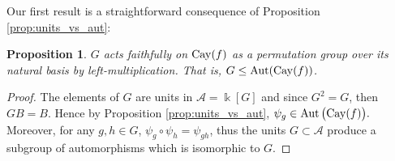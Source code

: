\documentclass[a4paper,12pt]{amsart}
\newtheorem{proposition}[theorem]{Proposition}
\theoremstyle{definition}
\theoremstyle{remark}
\newtheorem{remark}[theorem]{Remark}
\newcommand{\Aut}{\operatorname{Aut}}
\newcommand{\Cay}{{\rm Cay}}
\newcommand{\supp}{\operatorname{supp}}
\newcommand{\A}{\mathcal{A}}
\begin{document}
Our first result is a straightforward consequence of Proposition \ref{prop:units_vs_aut}:
\begin{proposition}\label{prop:faith}
	$G$ acts faithfully on $\Cay(f)$ as a permutation group over its natural basis by left-multiplication. That is, $G\leq \Aut(\Cay(f))$.
\end{proposition}
\begin{proof}
The elements of $G$ are units in $\A=\Bbbk[G]$ and since $G^2=G$, then $GB=B$. Hence by Proposition \ref{prop:units_vs_aut}, $\psi_g \in \Aut\big(\Cay(f)\big).$ Moreover, for any $g,h\in G$, $\psi_g\circ\psi_h=\psi_{gh}$, thus the units $G\subset \A$ produce  a subgroup of automorphisms which is isomorphic to $G$.
\end{proof}

	\begin{comment}
	Suppose that $\Cay(f)$ is regular but not simple.
	To prove that $\Cay(f)$ is simple, we use Corollary 4.6 of \cite{Cabrera-Siles-Velasco}. Hence, the structure matrix of $\Cay(f)$ must be
	$$M_G(\Cay(f))=\left(
	\begin{array}{ccc|ccc}
	* & \ldots  & *  & * & \ldots & *\\
	\vdots & \ddots  & \vdots  & \vdots  & \ddots  & \vdots\\
	* & \ldots  & *  & *  & \ldots  & *\\
	\hline
	0 & \ldots  & 0  & * & \ldots  & *\\
	\vdots & \ddots & \vdots  & \vdots & r\times r & \vdots\\
	0 & \ldots & 0 & * & \ldots  & *\\
	\end{array}
	\right)$$	
	Consider all the ordered elements in $G$ so that $G=\{g_{r+1},\ldots,g_m,g_{1},\ldots,g_r\}$. Then, for $j\in\{1,\ldots,r\}$,
	$$g_j\cdot g_j=\sum_{h\in G}f(h)g_jh=\sum_{s\in S}f(s)g_js$$
	This implies that $g_js\in\{g_1,\ldots,g_r\}$ for all $j\in\{1,\ldots,r\}$ and for all $s\in S$. By hypothesis, $S$ generates $G$. So, given a $g\in G$ and $g\notin\{g_1,\ldots,g_r\}$ we obtain,
	$g_1^{-1}g=\prod_{i=1}^{l}s_i$ with $s_i\in S$. Therefore,
	$$g=g_1g_1^{-1}g=g_1(\prod_{i=1}^{l}s_i)=(g_1s_1)(\prod_{i=2}^{l}s_i)$$
	Observe that $g_{j_1}:=g_1s_1\in\{g_1,\ldots,g_r\}$.
	$$g=g_{j_1}(\prod_{i=2}^{l}s_i)=(g_{j_1}s_2)\prod_{i=3}^{l}s_i$$
	As before, $g_{j_2}:=g_{j_1}s2\in\{g_1,\ldots,g_r\}$. Hence,
	$$g=g_{j_1}(\prod_{i=2}^{l}s_i)=g_{j_2}\prod_{i=3}^{l}s_i=\ldots=g_{j_l}\in\{g_1,\ldots,g_r\}$$
	So, we reach a contradiction. Thus, $\Cay(f)$ is simple.
	\end{comment}
	
\end{document}
